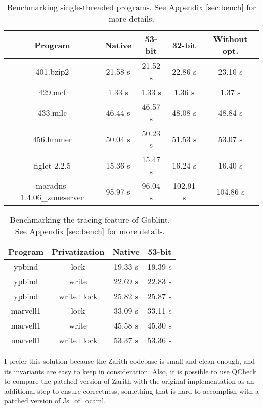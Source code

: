 \documentclass{scrartcl}
\begin{document}
\begin{table}[h!]
    \centering
    \begin{tabular}{c|cccc}
        \hline
        Program & Native & 53-bit & 32-bit & Without opt. \\
        \hline
        401.bzip2 & 21.58 s & 21.52 s & 22.86 s & 23.10 s \\
        429.mcf & 1.33 s & 1.33 s & 1.36 s & 1.37 s \\
        433.milc & 46.44 s & 46.57 s & 48.08 s & 48.84 s \\
        456.hmmer & 50.04 s & 50.23 s & 51.53 s & 53.07 s \\
        figlet-2.2.5 & 15.36 s & 15.47 s & 16.24 s & 16.40 s \\
        maradns-1.4.06\_zoneserver & 95.97 s & 96.04 s & 102.91 s & 104.86 s \\
        \hline
    \end{tabular}
    \caption{Benchmarking single-threaded programs. See Appendix \ref{sec:bench} for more details.}
    \label{tab:benchopt}
\end{table}

\begin{table}[h!]
    \centering
    \begin{tabular}{cc|cc}
        \hline
        Program & Privatization & Native & 53-bit \\
        \hline
        ypbind & lock & 19.33 s & 19.39 s \\
        ypbind & write & 22.69 s & 22.83 s \\
        ypbind & write+lock & 25.82 s & 25.87 s \\
        marvell1 & lock & 33.09 s & 33.11 s \\
        marvell1 & write & 45.58 s & 45.30 s \\
        marvell1 & write+lock & 53.37 s & 53.36 s \\
        \hline
    \end{tabular}
    \caption{Benchmarking the tracing feature of Goblint. See Appendix \ref{sec:bench} for more details.}
    \label{tab:benchtraces}
\end{table}

I prefer this solution because the Zarith codebase is small and clean enough, and its invariants are easy to keep in consideration. Also, it is possible to use QCheck to compare the patched version of Zarith with the original implementation as an additional step to ensure correctness, something that is hard to accomplish with a patched version of Js\_of\_ocaml.
\end{document}
